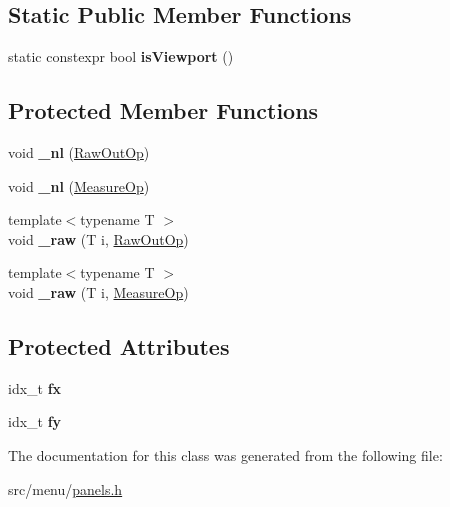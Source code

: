\subsection*{Static Public Member Functions}
\begin{DoxyCompactItemize}
\item 
\mbox{\label{classViewport_aa64aab939c53ecde5d08d677ba67a02e}} 
static constexpr bool {\bfseries is\+Viewport} ()
\end{DoxyCompactItemize}
\subsection*{Protected Member Functions}
\begin{DoxyCompactItemize}
\item 
\mbox{\label{classViewport_a7f6a61e55271d1f567644e3cc39d3474}} 
void {\bfseries \+\_\+nl} (\hyperlink{structOutOp}{Raw\+Out\+Op})
\item 
\mbox{\label{classViewport_a7a93a77217f9452f05164116b0a64d65}} 
void {\bfseries \+\_\+nl} (\hyperlink{structOutOp}{Measure\+Op})
\item 
\mbox{\label{classViewport_a2a88057ad99cbaf5869ddbef39f70545}} 
{\footnotesize template$<$typename T $>$ }\\void {\bfseries \+\_\+raw} (T i, \hyperlink{structOutOp}{Raw\+Out\+Op})
\item 
\mbox{\label{classViewport_af7abaca109e8abbb3791e29b38c52318}} 
{\footnotesize template$<$typename T $>$ }\\void {\bfseries \+\_\+raw} (T i, \hyperlink{structOutOp}{Measure\+Op})
\end{DoxyCompactItemize}
\subsection*{Protected Attributes}
\begin{DoxyCompactItemize}
\item 
\mbox{\label{classViewport_aeba4a7858ba0e1e3d35367ca850ca1cc}} 
idx\+\_\+t {\bfseries fx}
\item 
\mbox{\label{classViewport_ace9587cdf387c13eb92881e7940940a8}} 
idx\+\_\+t {\bfseries fy}
\end{DoxyCompactItemize}


The documentation for this class was generated from the following file\+:\begin{DoxyCompactItemize}
\item 
src/menu/\hyperlink{panels_8h}{panels.\+h}\end{DoxyCompactItemize}
